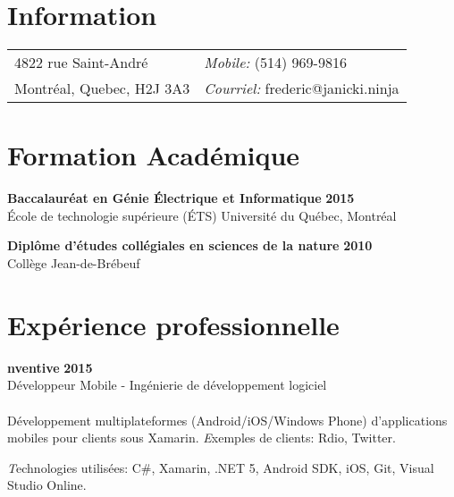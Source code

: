 \documentclass[margin,line]{res}
\begin{document}

\begin{resume}
\section{\sc Information}
\vspace{.05in}
\begin{tabular}{@{}p{2in}p{4in}}
4822 rue Saint-André& {\it Mobile:}  (514) 969-9816 \\            
Montréal, Quebec, H2J 3A3 &{\it Courriel:} frederic@janicki.ninja\\      
\end{tabular}



\section{\sc Formation Académique}
{\bf Baccalauréat en Génie Électrique et Informatique} \hfill {\bf 2015}\\
École de technologie supérieure (ÉTS)
Université du Québec, Montréal


{\bf Diplôme d'études collégiales en sciences de la nature} \hfill {\bf 2010}\\
Collège Jean-de-Brébeuf


\section{\sc Expérience professionnelle}
{\bf nventive} \hfill {\bf 2015}\\
Développeur Mobile - Ingénierie de développement logiciel\\\\
Développement multiplateformes (Android/iOS/Windows Phone) d'applications mobiles pour clients sous Xamarin.
{\emph Exemples de clients:} Rdio, Twitter.

{\emph Technologies utilisées:} C\#, Xamarin, .NET 5, Android SDK, iOS, Git, Visual Studio Online.



\end{resume}
\end{document}
